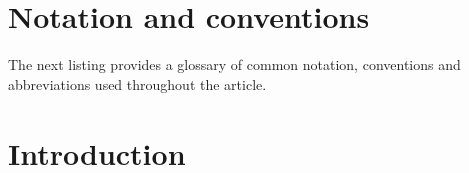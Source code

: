 \documentclass[11pt,reqno,a4letter]{article}
\numberwithin{figure}{section}
\numberwithin{table}{section}
\theoremstyle{plain}
\numberwithin{theorem}{section}
\theoremstyle{definition}
\begin{document}

\newpage
\renewcommand{\contentsname}{Article Index}
\setcounter{tocdepth}{2}
\tableofcontents

\newpage
\section*{Notation and conventions}
\label{Section_NotationAndConventions}

The next listing provides a glossary of common notation, conventions and 
abbreviations used throughout the article. 

\renewcommand*{\glsclearpage}{}
\renewcommand{\glossarysection}[2][]{}
\printglossary[type={symbols},
               style={glossstyleSymbol},
               nogroupskip=true]

\newpage
\section{Introduction} 
\label{subSection_MertensMxClassical_Intro} 
\end{document}
